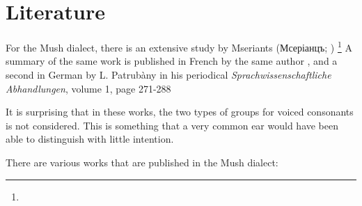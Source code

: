 \section{Literature}

For the Mush dialect, there is an extensive study by Mseriants (Мсеріанцъ; ) \citep{Mseriants-1897-Part1,Mseriants-1901-Part2}\footnote{} A summary of the same work is published in French by the same author \citep{Mserianz-1899-Mush}, and a second in German by L. Patrubàny in his periodical \textit{Sprachwissenschaftliche Abhandlungen}, volume 1, page 271-288

It is surprising that in these works, the two types of groups for voiced consonants is not considered. This is something that a very common ear would have been able to distinguish with little intention.

There are various works that are published in the Mush dialect: 

{\litoverview}


